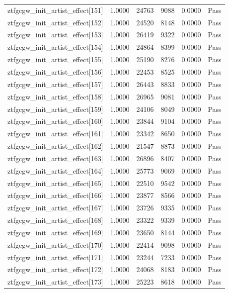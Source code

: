 \begin{table}[htbp]
\begin{tabular}{llrrll}
ztfgcgw\_init\_artist\_effect[151] & 1.0000 & 24763 & 9088 & 0.0000 & Pass \\
ztfgcgw\_init\_artist\_effect[152] & 1.0000 & 24520 & 8148 & 0.0000 & Pass \\
ztfgcgw\_init\_artist\_effect[153] & 1.0000 & 26419 & 9322 & 0.0000 & Pass \\
ztfgcgw\_init\_artist\_effect[154] & 1.0000 & 24864 & 8399 & 0.0000 & Pass \\
ztfgcgw\_init\_artist\_effect[155] & 1.0000 & 25190 & 8276 & 0.0000 & Pass \\
ztfgcgw\_init\_artist\_effect[156] & 1.0000 & 22453 & 8525 & 0.0000 & Pass \\
ztfgcgw\_init\_artist\_effect[157] & 1.0000 & 26443 & 8833 & 0.0000 & Pass \\
ztfgcgw\_init\_artist\_effect[158] & 1.0000 & 26965 & 9081 & 0.0000 & Pass \\
ztfgcgw\_init\_artist\_effect[159] & 1.0000 & 24106 & 8049 & 0.0000 & Pass \\
ztfgcgw\_init\_artist\_effect[160] & 1.0000 & 23844 & 9104 & 0.0000 & Pass \\
ztfgcgw\_init\_artist\_effect[161] & 1.0000 & 23342 & 8650 & 0.0000 & Pass \\
ztfgcgw\_init\_artist\_effect[162] & 1.0000 & 21547 & 8873 & 0.0000 & Pass \\
ztfgcgw\_init\_artist\_effect[163] & 1.0000 & 26896 & 8407 & 0.0000 & Pass \\
ztfgcgw\_init\_artist\_effect[164] & 1.0000 & 25773 & 9069 & 0.0000 & Pass \\
ztfgcgw\_init\_artist\_effect[165] & 1.0000 & 22510 & 9542 & 0.0000 & Pass \\
ztfgcgw\_init\_artist\_effect[166] & 1.0000 & 23877 & 8566 & 0.0000 & Pass \\
ztfgcgw\_init\_artist\_effect[167] & 1.0000 & 23726 & 9335 & 0.0000 & Pass \\
ztfgcgw\_init\_artist\_effect[168] & 1.0000 & 23322 & 9339 & 0.0000 & Pass \\
ztfgcgw\_init\_artist\_effect[169] & 1.0000 & 23650 & 8144 & 0.0000 & Pass \\
ztfgcgw\_init\_artist\_effect[170] & 1.0000 & 22414 & 9098 & 0.0000 & Pass \\
ztfgcgw\_init\_artist\_effect[171] & 1.0000 & 23244 & 7233 & 0.0000 & Pass \\
ztfgcgw\_init\_artist\_effect[172] & 1.0000 & 24068 & 8183 & 0.0000 & Pass \\
ztfgcgw\_init\_artist\_effect[173] & 1.0000 & 25223 & 8618 & 0.0000 & Pass \\

\end{tabular}
\end{table}
